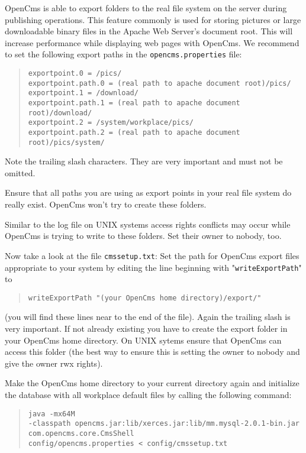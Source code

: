OpenCms is able to export folders to the real file system on the server during 
publishing operations. This feature commonly is used for storing pictures or large downloadable
binary files in the Apache Web Server's
document root. This will increase performance while displaying web pages with OpenCms.
We recommend to set the following export paths in the \texttt{opencms.properties} file:

\begin{quote}
\begin{verbatim}
exportpoint.0 = /pics/
exportpoint.path.0 = (real path to apache document root)/pics/
exportpoint.1 = /download/
exportpoint.path.1 = (real path to apache document root)/download/
exportpoint.2 = /system/workplace/pics/
exportpoint.path.2 = (real path to apache document root)/pics/system/
\end{verbatim}
\end{quote}

Note the trailing slash
characters. They are very important and must not be omitted.

Ensure that all paths you are using as export points in your real file system
do really exist. OpenCms won't try to create these folders.

Similar to the log file on UNIX systems access rights conflicts may occur while
OpenCms is trying to write to these folders. Set their owner to nobody, too.

Now take a look at the file \texttt{cmssetup.txt}:
Set the path for OpenCms export files appropriate to your system by editing
the line beginning with "\texttt{writeExportPath}" to 

\begin{quote}
\texttt{writeExportPath "(your OpenCms home directory)/export/"}
\end{quote}

(you will find these lines near to the end of the file).
Again the trailing slash is very important.
If not already existing you have to create the export folder in your OpenCms home
directory. On UNIX sytems ensure that OpenCms can access this folder
(the best way to ensure this is setting the owner to nobody and give
the owner rwx rights). 

Make the OpenCms home directory to your current directory again and
initialize the database with all workplace default files by calling the following command:

\begin{quote}
\texttt{java -mx64M \\
-classpath opencms.jar:lib/xerces.jar:lib/mm.mysql-2.0.1-bin.jar\\
com.opencms.core.CmsShell\\
config/opencms.properties < config/cmssetup.txt}
\end{quote}

